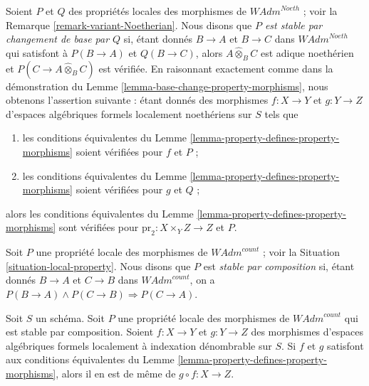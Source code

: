 \begin{remark}
\label{remark-base-change-variant-variant-Noetherian}
Soient $P$ et $Q$ des propriétés locales des morphismes de
$\textit{WAdm}^{Noeth}$ ; voir la Remarque \ref{remark-variant-Noetherian}.
Nous disons que {\it $P$ est stable par changement de base par $Q$}
si, étant donnés $B \to A$ et $B \to C$ dans $\textit{WAdm}^{Noeth}$
qui satisfont à $P(B \to A)$ et $Q(B \to C)$, alors
$A \widehat{\otimes}_B C$ est adique noethérien et
$P(C \to A \widehat{\otimes}_B C)$ est vérifiée.
En raisonnant exactement comme dans la démonstration du
Lemme \ref{lemma-base-change-property-morphisms},
nous obtenons l'assertion suivante :
étant donnés des morphismes $f : X \to Y$ et $g : Y \to Z$ d'espaces algébriques
formels localement noethériens sur $S$
tels que
\begin{enumerate}
\item les conditions équivalentes du
Lemme \ref{lemma-property-defines-property-morphisms}
soient vérifiées pour $f$ et $P$ ;
\item les conditions équivalentes du
Lemme \ref{lemma-property-defines-property-morphisms}
soient vérifiées pour $g$ et $Q$ ;
\end{enumerate}
alors les conditions équivalentes du
Lemme \ref{lemma-property-defines-property-morphisms}
sont vérifiées pour $\text{pr}_2 : X \times_Y Z \to Z$ et $P$.
\end{remark}

\begin{situation}
\label{situation-composition-local-property}
Soit $P$ une propriété locale des morphismes de $\textit{WAdm}^{count}$ ; voir la
Situation \ref{situation-local-property}. Nous disons que $P$ est {\it stable par
composition} si, étant donnés $B \to A$ et $C \to B$ dans $\textit{WAdm}^{count}$,
on a $P(B \to A) \wedge P(C \to B) \Rightarrow P(C \to A)$.
\end{situation}

\begin{lemma}
\label{lemma-composition-property-morphisms}
Soit $S$ un schéma. Soit $P$ une propriété locale des morphismes de
$\textit{WAdm}^{count}$ qui est stable par composition.
Soient $f : X \to Y$ et $g : Y \to Z$ des morphismes d'espaces algébriques formels
localement à indexation dénombrable sur $S$. Si $f$ et $g$
satisfont aux conditions équivalentes du
Lemme \ref{lemma-property-defines-property-morphisms},
alors il en est de même de $g \circ f : X \to Z$.
\end{lemma}

